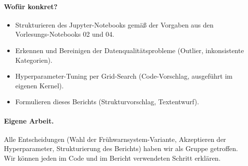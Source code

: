\documentclass[11pt,a4paper]{article}
\begin{document}
\paragraph{Wofür konkret?}
\begin{itemize}
    \item Strukturieren des Jupyter-Notebooks gemäß der Vorgaben aus den Vorlesungs-Notebooks 02 und 04.
    \item Erkennen und Bereinigen der Datenqualitätsprobleme (Outlier, inkonsistente Kategorien).
    \item Hyperparameter-Tuning per Grid-Search (Code-Vorschlag, ausgeführt im eigenen Kernel).
    \item Formulieren dieses Berichts (Strukturvorschlag, Textentwurf).
\end{itemize}

\paragraph{Eigene Arbeit.} Alle Entscheidungen (Wahl der Frühwarnsystem-Variante, Akzeptieren der Hyperparameter, Strukturierung des Berichts) haben wir als Gruppe getroffen. Wir können jeden im Code und im Bericht verwendeten Schritt erklären.
\end{document}
